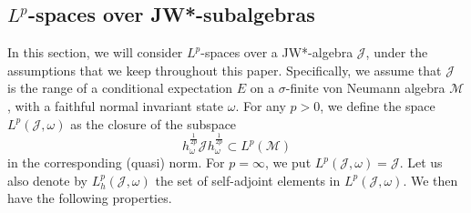\documentclass[12pt]{article}
\def\Me{\mathcal M}
\def\Je{\mathcal J}
\def\Ae{\mathcal A}
\theoremstyle{definition}
\theoremstyle{remark}
\begin{document}




\subsection{$L^p$-spaces over JW*-subalgebras}

In this section, we will consider $L^p$-spaces over a  JW*-algebra $\Je$,  under the assumptions that
we keep throughout this paper. 
Specifically, we assume that $\Je$  is the range of a conditional
expectation $E$ on a $\sigma$-finite von Neumann algebra $\Me$,  with a faithful normal invariant state $\omega$. For any $p>0$,
we define the space $L^p(\Je,\omega)$ as the closure of the subspace
\begin{equation}
    h_\omega^{\frac{1}{2p}} \Je h_\omega^{\frac{1}{2p}} \subset L^p(\Me)
\end{equation}
in the corresponding (quasi) norm. For $p=\infty$, we put $L^p(\Je,\omega)=\Je$. 
Let us also denote by $L^p_h(\Je,\omega)$ the set of self-adjoint elements in
$L^p(\Je,\omega)$. We then have the following properties.
\end{document}
